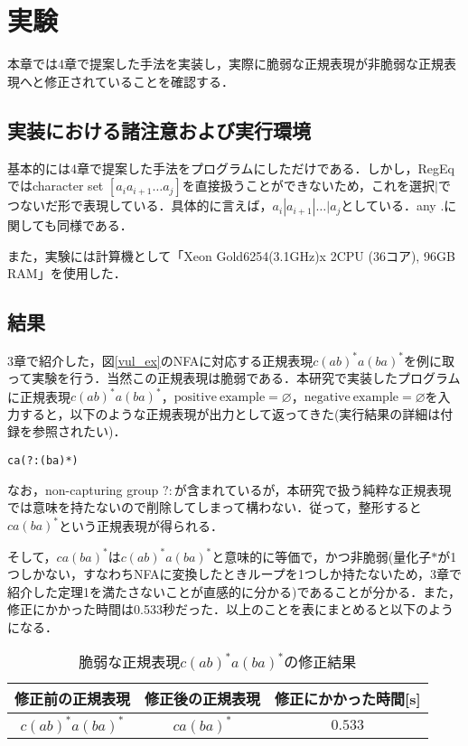 \documentclass[a4paper, 12pt, dvipdfmx, uplatex]{jsreport}
\begin{document}
\chapter{実験}
本章では4章で提案した手法を実装し，実際に脆弱な正規表現が非脆弱な正規表現へと修正されていることを確認する．

\section{実装における諸注意および実行環境}\label{caution}
基本的には4章で提案した手法をプログラムにしただけである．しかし，RegEqではcharacter set $[a_ia_{i+1}\ldots a_j]$を直接扱うことができないため，これを選択$|$でつないだ形で表現している．具体的に言えば，$a_i|a_{i+1}|\ldots|a_j$としている．any $.$に関しても同様である．

また，実験には計算機として「Xeon Gold6254(3.1GHz)x 2CPU (36コア), 96GB RAM」を使用した．

\section{結果}
3章で紹介した，図\ref{vul_ex}のNFAに対応する正規表現$c(ab)^*a(ba)^*$を例に取って実験を行う．当然この正規表現は脆弱である．本研究で実装したプログラムに正規表現$c(ab)^*a(ba)^*$，$\mathrm{positive \ example}=\varnothing$，$\mathrm{negative \ example}=\varnothing$を入力すると，以下のような正規表現が出力として返ってきた(実行結果の詳細は付録を参照されたい)．
\begin{lstlisting}[caption=$c(ab)^*a(ba)^*$を非脆弱化した正規表現,label=number]
ca(?:(ba)*)
\end{lstlisting}
なお，non-capturing group $?:$が含まれているが，本研究で扱う純粋な正規表現では意味を持たないので削除してしまって構わない．従って，整形すると$ca(ba)^*$という正規表現が得られる．

そして，$ca(ba)^*$は$c(ab)^*a(ba)^*$と意味的に等価で，かつ非脆弱(量化子$*$が1つしかない，すなわちNFAに変換したときループを1つしか持たないため，3章で紹介した定理1を満たさないことが直感的に分かる)であることが分かる．また，修正にかかった時間は0.533秒だった．以上のことを表にまとめると以下のようになる．

\begin{table}[H]
  \centering
  \caption{脆弱な正規表現$c(ab)^*a(ba)^*$の修正結果\label{vul_res1}}
  \begin{tabular}{c|c|c} \hline \hline
      修正前の正規表現 & 修正後の正規表現  & 修正にかかった時間[s]\\\hline
      $c(ab)^*a(ba)^*$  & $ca(ba)^*$ &$0.533$ \\\hline
  \end{tabular}
\end{table}
\end{document}
